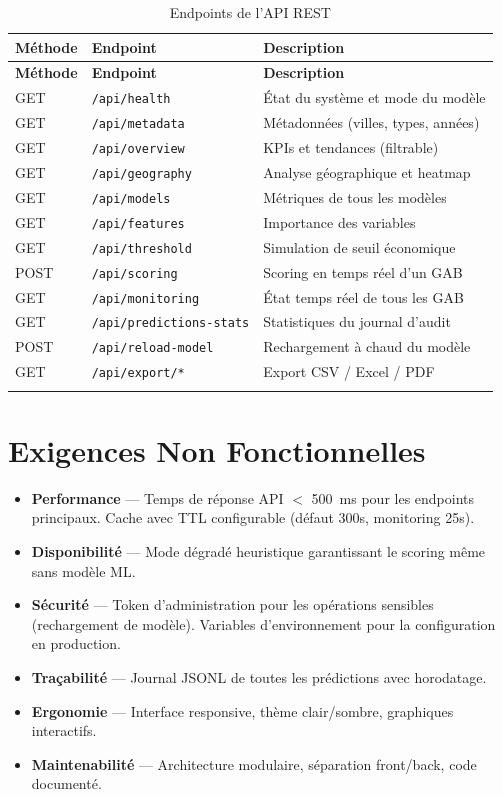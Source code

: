 \documentclass[a4paper,12pt]{report}
\begin{document}
\begin{longtable}{|l|l|p{6cm}|}
\hline
\rowcolor{bpmblue!10}
\textbf{Méthode} & \textbf{Endpoint} & \textbf{Description} \\
\hline
\endfirsthead
\hline
\rowcolor{bpmblue!10}
\textbf{Méthode} & \textbf{Endpoint} & \textbf{Description} \\
\hline
\endhead
GET & \texttt{/api/health} & État du système et mode du modèle \\
\hline
GET & \texttt{/api/metadata} & Métadonnées (villes, types, années) \\
\hline
GET & \texttt{/api/overview} & KPIs et tendances (filtrable) \\
\hline
GET & \texttt{/api/geography} & Analyse géographique et heatmap \\
\hline
GET & \texttt{/api/models} & Métriques de tous les modèles \\
\hline
GET & \texttt{/api/features} & Importance des variables \\
\hline
GET & \texttt{/api/threshold} & Simulation de seuil économique \\
\hline
POST & \texttt{/api/scoring} & Scoring en temps réel d'un GAB \\
\hline
GET & \texttt{/api/monitoring} & État temps réel de tous les GAB \\
\hline
GET & \texttt{/api/predictions-stats} & Statistiques du journal d'audit \\
\hline
POST & \texttt{/api/reload-model} & Rechargement à chaud du modèle \\
\hline
GET & \texttt{/api/export/*} & Export CSV / Excel / PDF \\
\hline
\caption{Endpoints de l'API REST}
\end{longtable}

\chapter{Exigences Non Fonctionnelles}

\begin{itemize}
    \item \textbf{Performance} — Temps de réponse API $<$ 500~ms pour les endpoints principaux. Cache avec TTL configurable (défaut 300s, monitoring 25s).
    \item \textbf{Disponibilité} — Mode dégradé heuristique garantissant le scoring même sans modèle ML.
    \item \textbf{Sécurité} — Token d'administration pour les opérations sensibles (rechargement de modèle). Variables d'environnement pour la configuration en production.
    \item \textbf{Traçabilité} — Journal JSONL de toutes les prédictions avec horodatage.
    \item \textbf{Ergonomie} — Interface responsive, thème clair/sombre, graphiques interactifs.
    \item \textbf{Maintenabilité} — Architecture modulaire, séparation front/back, code documenté.
\end{itemize}
\end{document}
